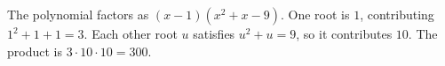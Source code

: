 The polynomial factors as $(x-1)(x^2+x-9)$. One root is $1$, contributing $1^2+1+1=3$. Each other root $u$ satisfies $u^2+u=9$, so it contributes $10$. The product is $3\cdot10\cdot10=\boxed{300}$.
